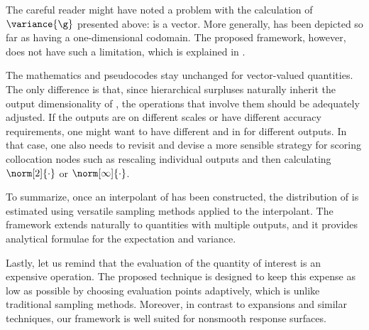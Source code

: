 The careful reader might have noted a problem with the calculation of
$\variance{\g}$ presented above: \h is a vector. More generally, \g has been
depicted so far as having a one-dimensional codomain. The proposed framework,
however, does not have such a limitation, which is explained in
.

\begin{remark} 
The mathematics and pseudocodes stay unchanged for vector-valued quantities. The
only difference is that, since hierarchical surpluses naturally inherit the
output dimensionality of \g, the operations that involve them should be
adequately adjusted. If the outputs are on different scales or have different
accuracy requirements, one might want to have different  and 
in  for different outputs. In that case, one also needs to
revisit  and devise a more sensible strategy for scoring
collocation nodes such as rescaling individual outputs and then calculating
$\norm[2]{\cdot}$ or $\norm[\infty]{\cdot}$.
\end{remark}

To summarize, once an interpolant of \g has been constructed, the distribution
of \g is estimated using versatile sampling methods applied to the interpolant.
The framework extends naturally to quantities with multiple outputs, and it
provides analytical formulae for the expectation and variance.

Lastly, let us remind that the evaluation of the quantity of interest is an
expensive operation. The proposed technique is designed to keep this expense as
low as possible by choosing evaluation points adaptively, which is unlike
traditional sampling methods. Moreover, in contrast to  expansions and
similar techniques, our framework is well suited for nonsmooth response
surfaces.
